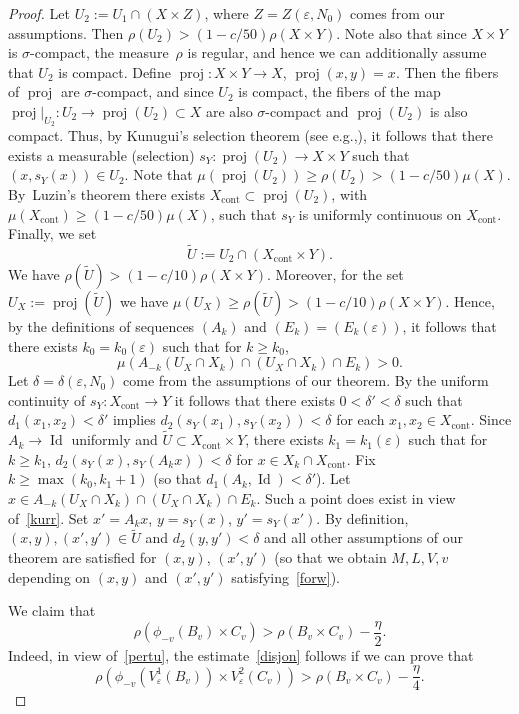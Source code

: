 \documentclass[11pt]{article}
\newcommand{\eg}{e.g.,\xspace}
\let\epsilon\varepsilon
\DeclareMathOperator{\Id}{Id}
\DeclareMathOperator{\proj}{proj}
\newcommand{\cont}{\mathrm{cont}}
\theoremstyle{definition}
\theoremstyle{plain}
\begin{document}
\begin{proof}
Let $U_2:=U_1\cap (X\times Z)$, where $Z=Z(\epsilon,N_0)$ comes from our assumptions. Then $\rho(U_2)>(1-c/50)\rho(X\times Y)$.
Note also that since $X\times Y$ is $\sigma$-compact, the measure~$\rho$ is regular, and hence we can additionally assume that $U_2$ is compact.
Define $\proj:X\times Y\to X$, $\proj(x,y)=x$. Then the fibers of $\proj$ are $\sigma$-compact, and since $U_2$ is compact, the fibers of the map $\proj|_{U_2}:U_2\to \proj(U_2)\subset X$ are also $\sigma$-compact and $\proj(U_2)$ is also compact. Thus, by Kunugui's selection theorem (see \eg \cite[Th.\,4.1]{Ga-Le-Sch}), it follows that there exists a measurable (selection) $s_Y :\proj(U_2)\to X\times Y$ such that $(x,s_Y(x))\in U_2$. Note that $\mu(\proj(U_2))\geq \rho(U_2)>(1-c/50)\mu(X)$. By~Luzin's theorem there exists $X_\cont\subset \proj(U_2)$, with $\mu(X_\cont)\geq (1-c/50)\mu(X)$, such that $s_Y$ is uniformly continuous on $X_\cont$. Finally, we set
\[
\widetilde{U}:=U_2\cap (X_\cont\times Y).
\]
We have $\rho(\widetilde{U})>(1-c/10)\rho(X\times Y)$. Moreover, for the set $U_X:=\proj(\widetilde{U})$ we have
$\mu(U_X)\geq \rho(\widetilde{U})>(1-c/10)\rho(X\times Y)$.
Hence, by the definitions of sequences $(A_k)$ and $(E_k)=(E_k(\epsilon))$, it follows that there exists $k_0=k_0(\epsilon)$ such that for $k\geq k_0$,
\begin{equation}\label{kurr}
\mu(A_{-k}(U_X\cap X_k)\cap (U_X\cap X_k)\cap E_k)>0.
\end{equation}
Let $\delta=\delta(\epsilon,N_0)$ come from the assumptions of our theorem. By the uniform continuity of $s_Y:X_\cont\to Y$ it follows that there exists $0<\delta'<\delta$ such that $d_1(x_1,x_2)<\delta'$ implies $d_2(s_Y(x_1),s_Y(x_2))<\delta$ for each $x_1,x_2\in X_\cont$.
Since $A_k\to \Id$ uniformly
and $\widetilde{U}\subset X_\cont\times Y$, there exists $k_1=k_1(\epsilon)$ such that for $k\geq k_1$, $d_2(s_Y(x),s_Y(A_kx))<\delta$ for $x\in X_k\cap X_\cont$. Fix $k\geq \max(k_0,k_1+1)$ (so that $d_1(A_k,\Id)<\delta'$). Let $x\in A_{-k}(U_X\cap X_k)\cap (U_X\cap X_k)\cap E_k$. Such a point does exist in view of~\eqref{kurr}. Set $x'=A_kx$, $y=s_Y(x)$, $y'=s_Y(x')$. By definition, $(x,y),(x',y')\in \widetilde{U}$ and $d_2(y,y')<\delta$ and all other assumptions of our theorem are satisfied for $(x,y)$, $(x',y')$ (so that we obtain $M,L,V,v$ depending on $(x,y)$ and $(x',y')$ satisfying~\eqref{forw}).

We claim that
\begin{equation}\label{disjon}
\rho(\phi_{-v}(B_v)
\times C_v)>\rho(B_v\times C_v)-\frac{\eta}{2}.
\end{equation}
Indeed, in view of~\eqref{pertu}, the estimate~\eqref{disjon} follows if we can prove that
\[
\rho(\phi_{-v}(V^1_{\epsilon}(B_v))
\times V^2_{\epsilon}(C_v))>\rho(B_v\times C_v)-\frac{\eta}{4}.
\]


\end{proof}
\end{document}
